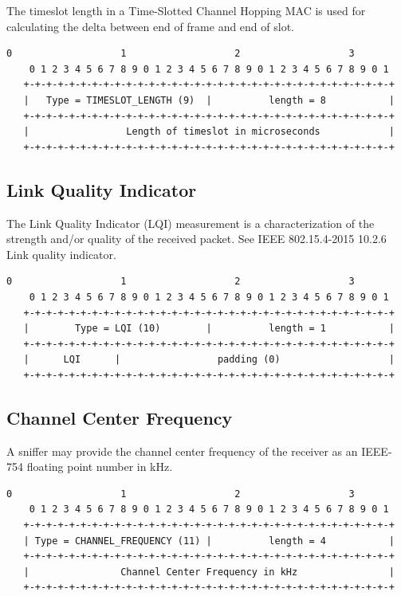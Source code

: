 \documentclass[12pt]{article}
\renewcommand\_{\textunderscore\allowbreak}
\begin{document}
The timeslot length in a Time-Slotted Channel Hopping MAC is used for
calculating the delta between end of frame and end of slot.

\begin{Verbatim}[samepage=true]
    0                   1                   2                   3
    0 1 2 3 4 5 6 7 8 9 0 1 2 3 4 5 6 7 8 9 0 1 2 3 4 5 6 7 8 9 0 1
   +-+-+-+-+-+-+-+-+-+-+-+-+-+-+-+-+-+-+-+-+-+-+-+-+-+-+-+-+-+-+-+-+
   |   Type = TIMESLOT_LENGTH (9)  |          length = 8           |
   +-+-+-+-+-+-+-+-+-+-+-+-+-+-+-+-+-+-+-+-+-+-+-+-+-+-+-+-+-+-+-+-+
   |                 Length of timeslot in microseconds            |
   +-+-+-+-+-+-+-+-+-+-+-+-+-+-+-+-+-+-+-+-+-+-+-+-+-+-+-+-+-+-+-+-+
\end{Verbatim}

\subsection{Link Quality Indicator}

The Link Quality Indicator (LQI) measurement is a characterization of the
strength and/or quality of the received packet.  See IEEE 802.15.4-2015 10.2.6
Link quality indicator.

\begin{Verbatim}[samepage=true]
    0                   1                   2                   3
    0 1 2 3 4 5 6 7 8 9 0 1 2 3 4 5 6 7 8 9 0 1 2 3 4 5 6 7 8 9 0 1
   +-+-+-+-+-+-+-+-+-+-+-+-+-+-+-+-+-+-+-+-+-+-+-+-+-+-+-+-+-+-+-+-+
   |        Type = LQI (10)        |          length = 1           |
   +-+-+-+-+-+-+-+-+-+-+-+-+-+-+-+-+-+-+-+-+-+-+-+-+-+-+-+-+-+-+-+-+
   |      LQI      |                 padding (0)                   |
   +-+-+-+-+-+-+-+-+-+-+-+-+-+-+-+-+-+-+-+-+-+-+-+-+-+-+-+-+-+-+-+-+
\end{Verbatim}

\subsection{Channel Center Frequency}

A sniffer may provide the channel center frequency of the receiver
as an IEEE-754 floating point number in kHz.

\begin{Verbatim}[samepage=true]
    0                   1                   2                   3
    0 1 2 3 4 5 6 7 8 9 0 1 2 3 4 5 6 7 8 9 0 1 2 3 4 5 6 7 8 9 0 1
   +-+-+-+-+-+-+-+-+-+-+-+-+-+-+-+-+-+-+-+-+-+-+-+-+-+-+-+-+-+-+-+-+
   | Type = CHANNEL_FREQUENCY (11) |          length = 4           |
   +-+-+-+-+-+-+-+-+-+-+-+-+-+-+-+-+-+-+-+-+-+-+-+-+-+-+-+-+-+-+-+-+
   |                Channel Center Frequency in kHz                |
   +-+-+-+-+-+-+-+-+-+-+-+-+-+-+-+-+-+-+-+-+-+-+-+-+-+-+-+-+-+-+-+-+
\end{Verbatim}
\end{document}

